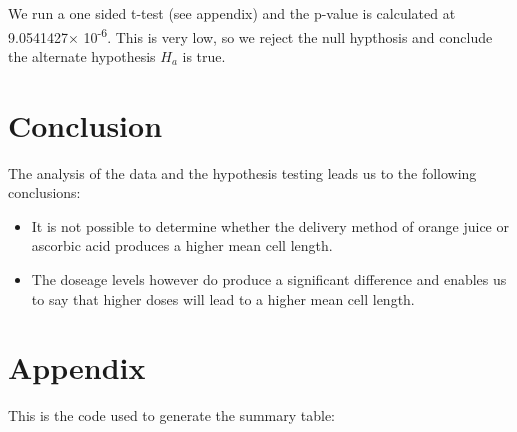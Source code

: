 \documentclass[]{article}
\providecommand{\tightlist}{%
  \setlength{\itemsep}{0pt}\setlength{\parskip}{0pt}}
\begin{document}
We run a one sided t-test (see appendix) and the p-value is calculated
at 9.0541427× 10\textsuperscript{-6}. This is very low, so we reject the
null hypthosis and conclude the alternate hypothesis \(H_a\) is true.

\section{Conclusion}\label{conclusion}

The analysis of the data and the hypothesis testing leads us to the
following conclusions:

\begin{itemize}
\tightlist
\item
  It is not possible to determine whether the delivery method of orange
  juice or ascorbic acid produces a higher mean cell length.
\item
  The doseage levels however do produce a significant difference and
  enables us to say that higher doses will lead to a higher mean cell
  length.
\end{itemize}

\clearpage
\appendix
{}

\section{Appendix}\label{appendix}

This is the code used to generate the summary table:
\end{document}
